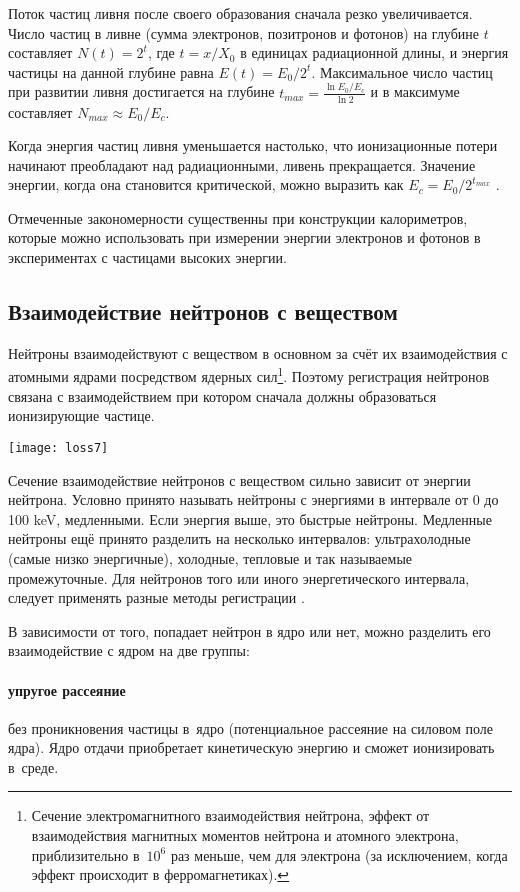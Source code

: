 Поток частиц ливня после своего образования сначала резко увеличивается.
Число частиц в ливне (сумма электронов, позитронов и фотонов) на глубине
$t$ составляет $N(t)=2^t$, где $t=x/X_0$ в единицах радиационной длины,
и энергия частицы на данной глубине равна $E(t)=E_0/2^t$. Максимальное
число частиц при развитии ливня достигается на глубине
$t_{max}=\frac{\ln E_0/E_c}{\ln2}$ и в максимуме составляет
$N_{max}\approx E_0/E_c$.

Когда энергия частиц ливня уменьшается настолько, что ионизационные
потери начинают преобладают над радиационными, ливень прекращается.
Значение энергии, когда она становится критической, можно выразить
как $E_c=E_0/2^{t_{max}}$ \cite{kor:06}.

Отмеченные закономерности существенны при конструкции калориметров,
которые можно использовать при измерении энергии электронов и фотонов
в экспериментах с частицами высоких энергии.

\subsection{Взаимодействие нейтронов с веществом}
Нейтроны взаимодействуют с веществом в основном за счёт их взаимодействия
с атомными ядрами посредством ядерных сил\footnote{Сечение
  электромагнитного взаимодействия нейтрона, эффект от взаимодействия
  магнитных моментов нейтрона и атомного электрона, приблизительно
  в~$10^6$ раз меньше, чем для электрона (за исключением, когда эффект
  происходит в ферромагнетиках).}. Поэтому регистрация нейтронов связана
с взаимодействием при котором сначала должны образоваться ионизирующие
частице.
\begin{floatingfigure}[l]{3.9cm}
  \texttt{[image: loss7]}
\end{floatingfigure}
\hspace{-0.3cm}
Сечение взаимодействие нейтронов с веществом сильно зависит от энергии
нейтрона. Условно принято называть нейтроны с энергиями в интервале
от 0 до 100 keV, медленными. Если энергия выше, это быстрые нейтроны.
Медленные нейтроны ещё принято разделить на несколько интервалов:
ультрахолодные (самые низко энергичные), холодные, тепловые  и так
называемые промежуточные. Для нейтронов того или иного энергетического
интервала, следует применять разные методы регистрации \cite{kal:66}.

В зависимости от того, попадает нейтрон в ядро или нет, можно разделить
его взаимодействие с ядром на две группы: \clearpage
\paragraph{упругое рассеяние} без проникновения частицы
в~ядро (потенциальное рассеяние на силовом поле ядра). Ядро отдачи
приобретает кинетическую энергию и сможет ионизировать в~среде.
